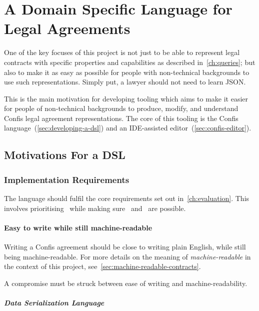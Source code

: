 \chapter{A Domain Specific Language for Legal Agreements}\label{ch:lang}

One of the key focuses of this project is not just to be able to represent legal contracts with specific properties and capabilities as described in~\autoref{ch:queries};
but also to make it as easy as possible for people with non-technical backgrounds to use such representations.
Simply put, a lawyer should not need to learn JSON.

This is the main motivation for developing tooling which aims to make it easier for people of non-technical backgrounds to produce, modify, and understand Confis legal agreement representations.
The core of this tooling is the Confis language~(\autoref{sec:developing-a-dsl}) and an IDE-assisted editor~(\autoref{sec:confis-editor}).


\section{Motivations For a DSL}\label{sec:developing-a-dsl}

\subsection{Implementation Requirements}\label{subsec:dsl:requirements}

The language should fulfil the core requirements set out in~\autoref{ch:evaluation}.
This involves prioritising~ while making sure~ and~ are possible.

\subsubsection{Easy to write while still machine-readable}

Writing a Confis agreement should be close to writing plain English, while still being machine-readable.
For more details on the meaning of \emph{machine-readable} in the context of this project, see~\autoref{sec:machine-readable-contracts}.


A compromise must be struck between ease of writing and machine-readability.

\paragraph{Data Serialization Language}

